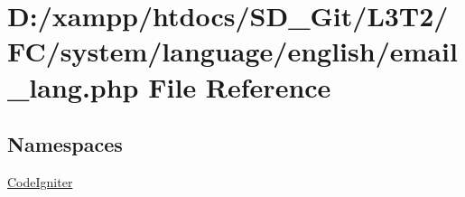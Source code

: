 \hypertarget{system_2language_2english_2email__lang_8php}{}\section{D\+:/xampp/htdocs/\+S\+D\+\_\+\+Git/\+L3\+T2/\+F\+C/system/language/english/email\+\_\+lang.php File Reference}
\label{system_2language_2english_2email__lang_8php}
\subsection*{Namespaces}
\begin{DoxyCompactItemize}
\item 
 \hyperlink{namespace_code_igniter}{Code\+Igniter}
\end{DoxyCompactItemize}
